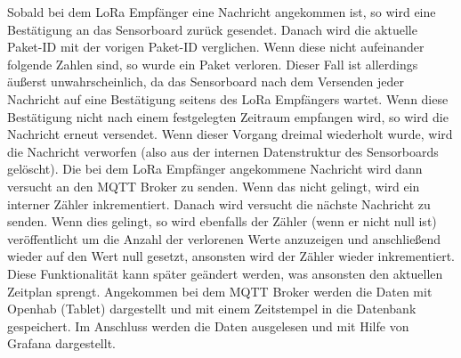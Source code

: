 \documentclass[a4paper, 12pt]{article}
\begin{document}
Sobald bei dem LoRa Empfänger eine Nachricht angekommen ist, so wird eine Bestätigung an das Sensorboard zurück gesendet. Danach wird die aktuelle Paket-ID mit der vorigen Paket-ID verglichen. Wenn diese nicht aufeinander folgende Zahlen sind, so wurde ein Paket verloren. Dieser Fall ist allerdings äußerst unwahrscheinlich, da das Sensorboard nach dem Versenden jeder Nachricht auf eine Bestätigung seitens des LoRa Empfängers wartet. Wenn diese Bestätigung nicht nach einem festgelegten Zeitraum empfangen wird, so wird die Nachricht erneut versendet. Wenn dieser Vorgang dreimal wiederholt wurde, wird die Nachricht verworfen (also aus der internen Datenstruktur des Sensorboards gelöscht). Die bei dem LoRa Empfänger angekommene Nachricht wird dann versucht an den MQTT Broker zu senden. Wenn das nicht gelingt, wird ein interner Zähler inkrementiert. Danach wird versucht die nächste Nachricht zu senden. Wenn dies gelingt, so wird ebenfalls der Zähler (wenn er nicht null ist) veröffentlicht um die Anzahl der verlorenen Werte anzuzeigen und anschließend wieder auf den Wert null gesetzt, ansonsten wird der Zähler wieder inkrementiert. Diese Funktionalität kann später geändert werden, was ansonsten den aktuellen Zeitplan sprengt. Angekommen bei dem MQTT Broker werden die Daten mit Openhab (Tablet) dargestellt und mit einem Zeitstempel in die Datenbank gespeichert. Im Anschluss werden die Daten ausgelesen und mit Hilfe von Grafana dargestellt.
\end{document}
